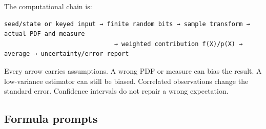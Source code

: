 The computational chain is:

\begin{verbatim}
seed/state or keyed input → finite random bits → sample transform → actual PDF and measure
                              → weighted contribution f(X)/p(X) → average → uncertainty/error report
\end{verbatim}

Every arrow carries assumptions. A wrong PDF or measure can bias the result. A low-variance estimator can still be biased. Correlated observations change the standard error. Confidence intervals do not repair a wrong expectation.

\subsection{Formula prompts}\label{appendix-cb5af353ef77-formula-prompts}

\hypertarget{appendix-cb5af353ef77-formula-prompts}{}

